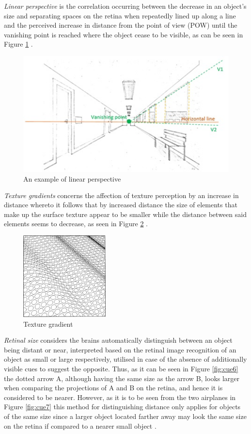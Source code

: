 \textit{Linear perspective} is the correlation occurring between the decrease in an object’s size and separating spaces on the retina when repeatedly lined up along a line and the perceived increase in distance from the point of view (POW) until the vanishing point is reached where the object cease to be visible, as can be seen in Figure \ref{fig:cue4} \cite{Gale}.

\begin{figure}[h!]
   \centering
   \includegraphics[scale=0.8]{figures/cue4.jpg}
   \caption{An example of linear perspective}\label{fig:cue4}
\end{figure}

\textit{Texture gradients} concerns the affection of texture perception by an increase in distance whereto it follows that by increased distance the size of elements that make up the surface texture appear to be smaller while the distance between said elements seems to decrease, as seen in Figure \ref{fig:cue5} \cite{Gale}.

\begin{figure}[h!]
   \centering
   \includegraphics[width=0.4\textwidth]{figures/cue5.jpg}
   \caption{Texture gradient \cite{Heeger}}\label{fig:cue5}
\end{figure}

\textit{Retinal size} considers the brains automatically distinguish between an object being distant or near, interpreted based on the retinal image recognition of an object as small or large respectively, utilised in case of the absence of additionally visible cues to suggest the opposite. Thus, as it can be seen in Figure \ref{fig:cue6} the dotted arrow A, although having the same size as the arrow B, looks larger when comparing the projections of A and B on the retina, and hence it is considered to be nearer. However, as it is to be seen from the two airplanes in Figure \ref{fig:cue7} this method for distinguishing distance only applies for objects of the same size since a larger object located farther away may look the same size on the retina if compared to a nearer small object \cite{Gale}.

